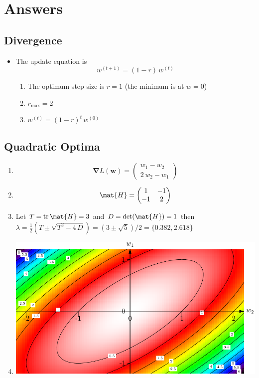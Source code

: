\documentclass[11pt]{article}
\newcommand{\grad}{\bm{\nabla}}
\begin{document}
\section{Answers}
\label{sec:org8419519}

\subsection{Divergence}
\label{sec:org258b86b}
\begin{itemize}
\item The update equation is 
$$ w^{(t+1)} = (1-r) \, w^{(t)} $$
\begin{enumerate}
\item The optimum step size is \(r=1\) (the minimum is at \(w=0\))
\item \(r_{\max}=2\)
\item \(w^{(t)} = (1-r)^t \, w^{(0)}\)
\end{enumerate}
\end{itemize}

\subsection{Quadratic Optima}
\label{sec:org843fdd6}
\begin{enumerate}
\item $$ \grad L(\bm{w}) = \begin{pmatrix} w_1 - w_2 \\ 2\,w_2 - w_1 \end{pmatrix} $$
\item $$ \mat{H} = \begin{pmatrix} 1 & -1\\ -1 & 2 \end{pmatrix} $$
\item Let \(T = \mathrm{tr}\, \mat{H} =3\) and \(D = \det(\mat{H}) = 1\) then
\(\lambda = \tfrac{1}{2} \left(T \pm \sqrt{T^2-4\,D}\right) =
      (3\pm\sqrt{5})/2 = \{0.382, 2.618\}\)
\item \begin{center}
\includegraphics[width=.9\linewidth]{./figures/quadProblem.pdf}
\end{center}
\end{enumerate}
\end{document}

